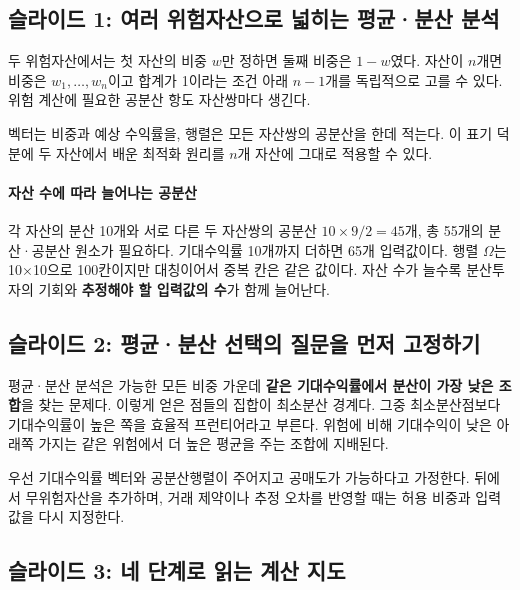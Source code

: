 \documentclass[11pt,a4paper]{article}
\begin{document}
\subsection{슬라이드 1: 여러 위험자산으로 넓히는 평균·분산 분석}

두 위험자산에서는 첫 자산의 비중 $w$만 정하면 둘째 비중은 $1-w$였다. 자산이 $n$개면 비중은 $w_1,\ldots,w_n$이고 합계가 1이라는 조건 아래 $n-1$개를 독립적으로 고를 수 있다. 위험 계산에 필요한 공분산 항도 자산쌍마다 생긴다.
\par

벡터는 비중과 예상 수익률을, 행렬은 모든 자산쌍의 공분산을 한데 적는다. 이 표기 덕분에 두 자산에서 배운 최적화 원리를 $n$개 자산에 그대로 적용할 수 있다.
\par

\paragraph{자산 수에 따라 늘어나는 공분산}

각 자산의 분산 10개와 서로 다른 두 자산쌍의 공분산 $10\times9/2=45$개, 총 55개의 분산·공분산 원소가 필요하다. 기대수익률 10개까지 더하면 65개 입력값이다. 행렬 $\Omega$는 10×10으로 100칸이지만 대칭이어서 중복 칸은 같은 값이다. 자산 수가 늘수록 분산투자의 기회와 \textbf{추정해야 할 입력값의 수}가 함께 늘어난다.
\par

\subsection{슬라이드 2: 평균·분산 선택의 질문을 먼저 고정하기}

평균·분산 분석은 가능한 모든 비중 가운데 \textbf{같은 기대수익률에서 분산이 가장 낮은 조합}을 찾는 문제다. 이렇게 얻은 점들의 집합이 최소분산 경계다. 그중 최소분산점보다 기대수익률이 높은 쪽을 효율적 프런티어라고 부른다. 위험에 비해 기대수익이 낮은 아래쪽 가지는 같은 위험에서 더 높은 평균을 주는 조합에 지배된다.
\par

우선 기대수익률 벡터와 공분산행렬이 주어지고 공매도가 가능하다고 가정한다. 뒤에서 무위험자산을 추가하며, 거래 제약이나 추정 오차를 반영할 때는 허용 비중과 입력값을 다시 지정한다.
\par

\subsection{슬라이드 3: 네 단계로 읽는 계산 지도}
\end{document}
